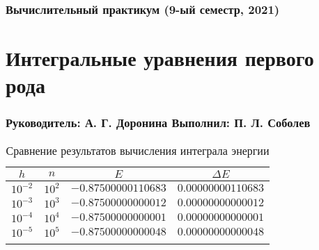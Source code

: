 




\subsubsection*{Вычислительный практикум (9-ый семестр, 2021)}
\section*{Интегральные уравнения первого рода}
\subsubsection*{Руководитель: А. Г. Доронина \hspace{2em} Выполнил: П. Л. Соболев}

\begin{table}[h]
  \centering
  \caption{Сравнение результатов вычисления интеграла энергии}
  \begin{tabular}{cccc}
    \toprule
    $ h $ &
    $ n $ &
    $ E $ &
    $ \Delta E $ \\
    \midrule
    $ 10^{-2} $ & $ 10^2 $ & $ -0.87500000110683 $ & $ 0.00000000110683 $ \\
    \arrayrulecolor{black!40}
    \midrule
    $ 10^{-3} $ & $ 10^3 $ & $ -0.87500000000012 $ & $ 0.00000000000012 $ \\
    \midrule
    $ 10^{-4} $ & $ 10^4 $ & $ -0.87500000000001 $ & $ 0.00000000000001 $ \\
    \midrule
    $ 10^{-5} $ & $ 10^5 $ & $ -0.87500000000048 $ & $ 0.00000000000048 $ \\
    \arrayrulecolor{black}
    \bottomrule
  \end{tabular}
\end{table}


